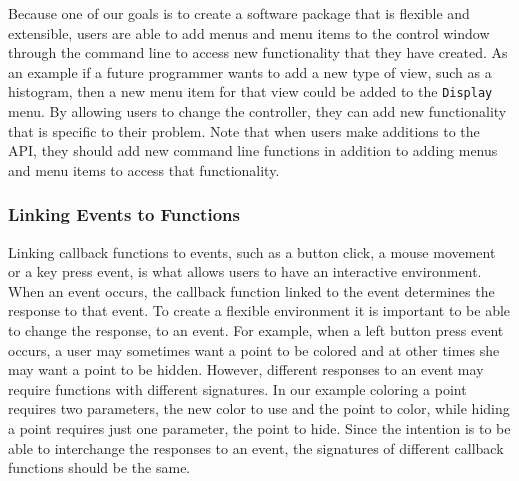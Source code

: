 \documentclass{article}[11pt]
\newcommand{\Rslot}[1]{\textsl{#1}}
\newcommand{\Rclass}[1]{\texttt{#1}}
\begin{document}
Because one of our goals is to create a software package that is
flexible and extensible, users are able to add menus and menu items to
the control window through the command line to access new
functionality that they have created.  As an example if a future
programmer wants to add a new type of view, such as a histogram, then
a new menu item for that view could be added to the \texttt{Display}
menu.  By allowing users to change the controller, they can add new
functionality that is specific to their problem.  Note that when users
make additions to the API, they should add new command line functions
in addition to adding menus and menu items to access that
functionality.

\subsubsection{Linking Events to Functions}
\label{Ssec:OneEvent}

Linking callback functions to events, such as a button click, a mouse
movement or a key press event, is what allows users to have an
interactive environment.  When an event occurs, the callback function
linked to the event determines the response to that event.  To create
a flexible environment it is important to be able to change the
response, to an event.  For example, when a left button press event
occurs, a user may sometimes want a point to be colored and at other
times she may want a point to be hidden.  However, different responses
to an event may require functions with different signatures.  In our
example coloring a point requires two parameters, the new color to use
and the point to color, while hiding a point
requires just one parameter, the point to hide.  Since the intention is
to be able to interchange the responses to an event, the signatures of
different callback functions should be the same.


\end{document}
